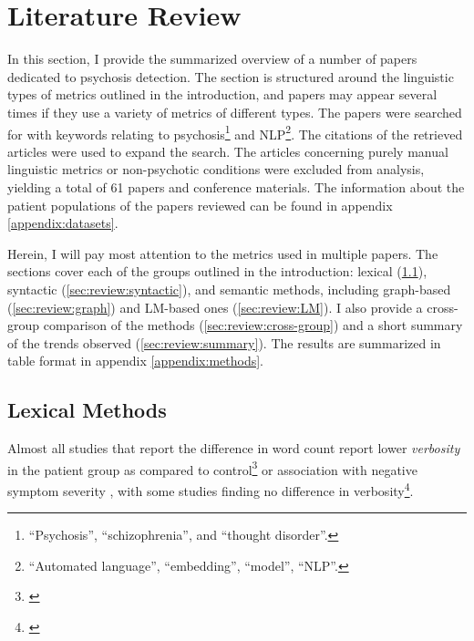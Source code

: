 
\chapter{Literature Review} %
\label{chap:2:review} 

In this section, I provide the summarized overview of a number of papers dedicated to psychosis detection. The section is structured around the linguistic types of metrics outlined in the introduction, and papers may appear several times if they use a variety of metrics of different types. The papers were searched for with keywords relating to psychosis\footnote{``Psychosis'', ``schizophrenia'', and ``thought disorder''.} and NLP\footnote{``Automated language'', ``embedding'',  ``model'', ``NLP''.}. The citations of the retrieved articles were used to expand the search. The articles concerning purely manual linguistic metrics or non-psychotic conditions were excluded from analysis, yielding a total of 61 papers and conference materials. The information about the patient populations of the papers reviewed can be found in appendix \ref{appendix:datasets}.

Herein, I will pay most attention to the metrics used in multiple papers. The sections cover each of the groups outlined in the introduction: lexical (\ref{sec:review:lexical}), syntactic (\ref{sec:review:syntactic}), and semantic methods, including graph-based (\ref{sec:review:graph}) and LM-based ones (\ref{sec:review:LM}). I also provide a cross-group comparison of the methods (\ref{sec:review:cross-group}) and a short summary of the trends observed (\ref{sec:review:summary}). The results are summarized in table format in appendix \ref{appendix:methods}.


\section{Lexical Methods}
\label{sec:review:lexical}

Almost all studies that report the difference in word count report lower \textit{verbosity} in the patient group as compared to control\footnote{\cite{mota2014graph, iter2018automatic, willits2018evidence, dore2019quantification, just2019coherence, just2020modeling, panicheva2020corpus, morgan2021natural, spencer2021lower, voppel2021quantified, liang2022widespread, parola2022speech}} or association with negative symptom severity \citep{morgan2021natural, minor2023automated}, with some studies finding no difference in verbosity\footnote{\citep{mota2012speech, gupta2018automated, tang2021natural, alonso2022language, alonso2022progressive, schneider2023syntactic, nettekoven2023semantic}}. 

